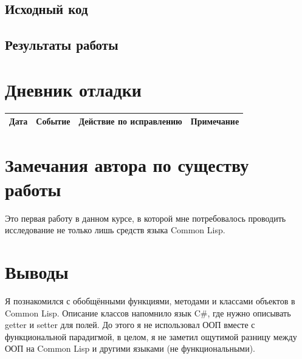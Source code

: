\documentclass[12pt]{article}
\begin{document}
\subsection{Исходный код}


\pagebreak
\subsection{Результаты работы}


\pagebreak
\section{Дневник отладки}
\begin{tabular}{|p{50pt}|p{140pt}|p{140pt}|p{80pt}|}
\hline
Дата & Событие & Действие по исправлению & Примечание \\
\hline
\end{tabular}

\section{Замечания автора по существу работы}

Это первая работу в данном курсе, в которой мне потребовалось проводить исследование не только лишь средств языка Common Lisp.

\section{Выводы}
Я познакомился с обобщёнными функциями, методами и классами объектов в Common Lisp. Описание классов напомнило язык C\#, где 
нужно описывать getter и setter для полей. До этого я не использовал ООП вместе с функциональной парадигмой, в целом, я не 
заметил ощутимой разницу между ООП на Common Lisp и другими языками (не функциональными).
\end{document}
